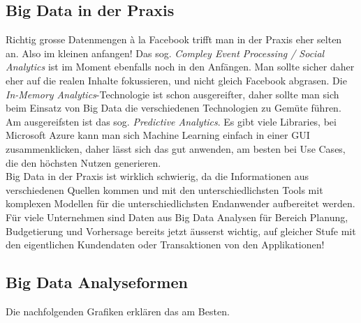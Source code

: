 \subsection{Big Data in der Praxis}
Richtig grosse Datenmengen à la Facebook trifft man in der Praxis eher selten an. Also im kleinen anfangen! Das sog. \textit{Compley Event Processing / Social Analytics} ist im Moment ebenfalls noch in den Anfängen. Man sollte sicher daher eher auf die realen Inhalte fokussieren, und nicht gleich Facebook abgrasen. Die \textit{In-Memory Analytics}-Technologie ist schon ausgereifter, daher sollte man sich beim Einsatz von Big Data die verschiedenen Technologien zu Gemüte führen. Am ausgereifsten ist das sog. \textit{Predictive Analytics}. Es gibt viele Libraries, bei Microsoft Azure kann man sich Machine Learning einfach in einer GUI zusammenklicken, daher lässt sich das gut anwenden, am besten bei Use Cases, die den höchsten Nutzen generieren. \\
Big Data in der Praxis ist wirklich schwierig, da die Informationen aus verschiedenen Quellen kommen und mit den unterschiedlichsten Tools mit komplexen Modellen für die unterschiedlichsten Endanwender aufbereitet werden.\\
Für viele Unternehmen sind Daten aus Big Data Analysen für Bereich Planung, Budgetierung und Vorhersage bereits jetzt äusserst wichtig, auf gleicher Stufe mit den eigentlichen Kundendaten oder Transaktionen von den Applikationen!

\newpage
\subsection{Big Data Analyseformen}
Die nachfolgenden Grafiken erklären das am Besten.


